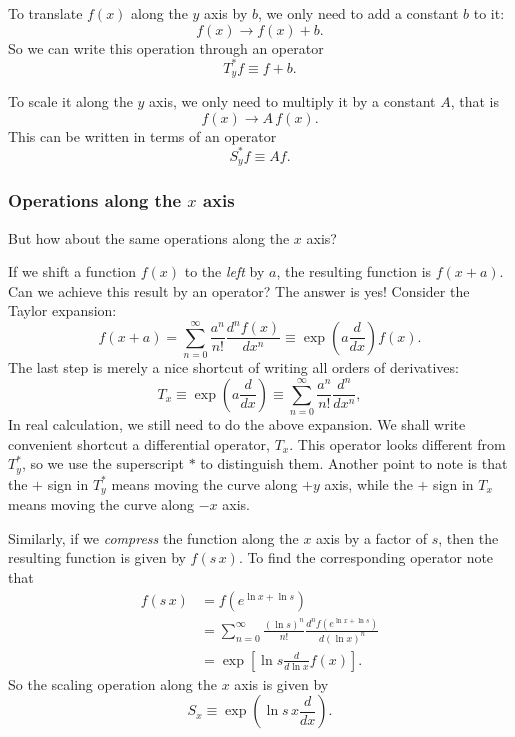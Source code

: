 \documentclass{article}
\begin{document}
To translate $f(x)$ along the $y$ axis by $b$,
we only need to add a constant $b$ to it:
\begin{equation}
  f(x) \rightarrow f(x) + b.
  \label{eq:ys_shift}
\end{equation}
So we can write this operation through an operator
\begin{equation}
  T_y^* f \equiv f + b.
  \label{eq:ys_shift2}
\end{equation}

To scale it along the $y$ axis, we only need to multiply it
by a constant $A$, that is
\begin{equation}
  f(x) \rightarrow A \, f(x).
  \label{eq:ys_scale}
\end{equation}
This can be written in terms of an operator
\begin{equation}
  S_y^* f \equiv A f.
  \label{eq:ys_scale2}
\end{equation}


\subsubsection{Operations along the $x$ axis}

But how about the same operations along the $x$ axis?

If we shift a function $f(x)$ to the \emph{left} by $a$,
the resulting function is $f(x + a)$.
Can we achieve this result by an operator?
The answer is yes!
Consider the Taylor expansion:
$$
f(x + a) = \sum_{n = 0}^\infty \frac{a^n}{n!} \frac{d^n f(x) }{dx^n}
\equiv \exp\left(a \frac{d}{dx} \right) f(x).
$$
The last step is merely a nice shortcut of
writing all orders of derivatives:
$$
T_x \equiv
\exp\left(a \frac{d}{dx} \right)
\equiv
\sum_{n = 0}^\infty \frac{a^n}{n!} \frac{d^n }{ dx^n},
$$
In real calculation,
we still need to do the above expansion.
%
We shall write convenient shortcut
a differential operator, $T_x$.
%
This operator looks different from $T_y^*$,
so we use the superscript $*$
to distinguish them.
%
Another point to note is that the $+$ sign in $T_y^*$
means moving the curve along $+y$ axis,
while the $+$ sign in $T_x$ means
moving the curve along $-x$ axis.
%

Similarly, if we \emph{compress} the function along the $x$ axis by a factor of $s$,
then the resulting function is given by $f(s \, x)$.
To find the corresponding operator note that
$$
\begin{aligned}
f(s \, x)
&= f( e^{\ln x + \ln s} ) \\
&= \sum_{n = 0}^\infty \frac{(\ln s)^n}{n!} \frac{d^n f(e^{\ln x + \ln s}) }{ d(\ln x)^n } \\
&= \exp\left[ \ln s \frac{d}{d\ln x} f(x) \right].
\end{aligned}
$$
So the scaling operation along the $x$ axis is given by
$$
S_x \equiv \exp\left(\ln s \, x \frac{d}{dx} \right).
$$
\end{document}
